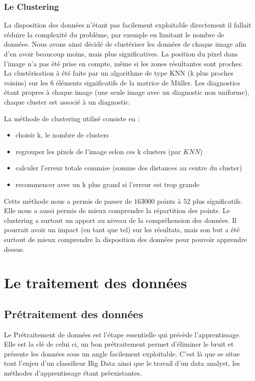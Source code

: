 \documentclass[a4paper,10pt]{report}
\begin{document}
\subsection{Le Clustering}
La disposition des données n'étant pas facilement exploitable directement il fallait réduire la complexité du problème, par exemple en limitant le nombre de données. Nous avons ainsi décidé de clustériser les données de chaque image afin d'en avoir beaucoup moins, mais plus significatives. La position du pixel dans l'image n'a pas été prise en compte, même si les zones résultantes sont proches. La clustérisation à été faite par un algorithme de type KNN (k plus proches voisins) sur les $6$ éléments significatifs de la matrice de Müller. Les diagnostics étant propres à chaque image (une seule image avec un diagnostic non uniforme), chaque cluster est associé à un diagnostic. 

La méthode de clustering utilisé consiste en :
\begin{itemize}
\item choisir k, le nombre de clusters
\item regrouper les pixels de l'image selon ces k clusters (par $KNN$)
\item calculer l'erreur totale commise (somme des distances au centre du cluster)
\item recommencer avec un k plus grand si l'erreur est trop grande
\end{itemize}

Cette méthode nous a permis de passer de $163 000$ points à $52$ plus significatifs. Elle nous a aussi permis de mieux comprendre la répartition des points. Le clustering a surtout un apport au niveau de la compréhension des données. Il pourrait avoir un impact (en tant que tel) sur les résultats, mais son but a été surtout de mieux comprendre la disposition des données pour pouvoir apprendre dessus.
\chapter{Le traitement des données}

\section{Prétraitement des données}
Le Prétraitement de données est l'étape essentielle qui précède l'apprentissage. Elle est la clé de celui ci, un bon prétraitement permet d'éliminer le bruit et présente les données sous un angle facilement exploitable. C'est là que se situe tout l'enjeu d'un classifieur Big Data ainsi que le travail d'un data analyst, les méthodes d'apprentissage étant préexistantes.  
\end{document}

